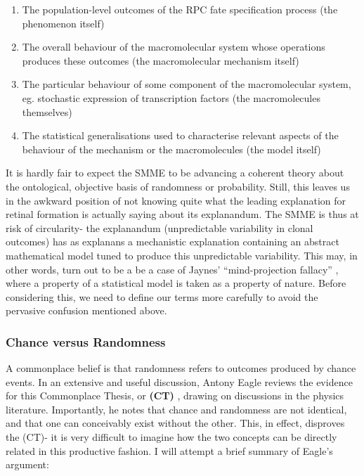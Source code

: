 \begin{enumerate}
\item The population-level outcomes of the RPC fate specification process (the phenomenon itself)
\item The overall behaviour of the macromolecular system whose operations produces these outcomes (the macromolecular mechanism itself)
\item The particular behaviour of some component of the macromolecular system, eg. stochastic expression of transcription factors (the macromolecules themselves)
\item The statistical generalisations used to characterise relevant aspects of the behaviour of the mechanism or the macromolecules (the model itself)
\end{enumerate}

It is hardly fair to expect the SMME to be advancing a coherent theory about the ontological, objective basis of randomness or probability. Still, this leaves us in the awkward position of not knowing quite what the leading explanation for retinal formation is actually saying about its explanandum. The SMME is thus at risk of circularity- the explanandum (unpredictable variability in clonal outcomes) has as explanans a mechanistic explanation containing an abstract mathematical model tuned to produce this unpredictable variability. This may, in other words, turn out to be a be a case of Jaynes' ``mind-projection fallacy'' \cite[pp.506]{Jaynes2003}, where a property of a statistical model is taken as a property of nature. Before considering this, we need to define our terms more carefully to avoid the pervasive confusion mentioned above.

\subsubsection{Chance versus Randomness}
A commonplace belief is that randomness refers to outcomes produced by chance events. In an extensive and useful discussion, Antony Eagle reviews the evidence for this Commonplace Thesis, or \textbf{(CT)} \cite{Eagle2018}, drawing on discussions in the physics literature. Importantly, he notes that chance and randomness are not identical, and that one can conceivably exist without the other. This, in effect, disproves the (CT)- it is very difficult to imagine how the two concepts can be directly related in this productive fashion. I will attempt a brief summary of Eagle's argument:

